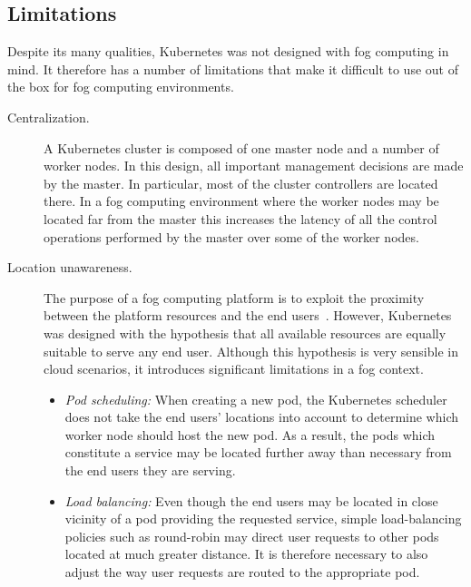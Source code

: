 \documentclass[letterpaper,twocolumn,10pt]{article}
\begin{document}
\subsection{Limitations}

Despite its many qualities, Kubernetes was not designed with fog
computing in mind. It therefore has a number of limitations that make
it difficult to use out of the box for fog computing environments.

\begin{description}
\item[Centralization.] A Kubernetes cluster is composed of one master
  node and a number of worker nodes. In this design, all important
  management decisions are made by the master. In particular, most of
  the cluster controllers are located there. In a fog computing
  environment where the worker nodes may be located far from the
  master this increases the latency of all the control operations
  performed by the master over some of the worker nodes.

\item[Location unawareness.]  The purpose of a fog computing platform
  is to exploit the proximity between the platform resources and the
  end users~\cite{bonomi2014}. However,
  Kubernetes was designed with the hypothesis that all available
  resources are equally suitable to serve any end user. Although this
  hypothesis is very sensible in cloud scenarios, it introduces
  significant limitations in a fog context.

  \begin{itemize}[leftmargin=*,itemsep=2pt,topsep=-3pt,labelsep=6pt]
  \item \emph{Pod scheduling:} When creating a new pod, the Kubernetes
    scheduler does not take the end users' locations into account to
    determine which worker node should host the new pod. As a result,
    the pods which constitute a service may be located further away
    than necessary from the end users they are serving.
  \item \emph{Load balancing:} Even though the end users may be
    located in close vicinity of a pod providing the requested
    service, simple load-balancing policies such as round-robin may
    direct user requests to other pods located at much greater
    distance. It is therefore necessary to also adjust the way user
    requests are routed to the appropriate pod.
  \end{itemize}
\end{description}
\end{document}
